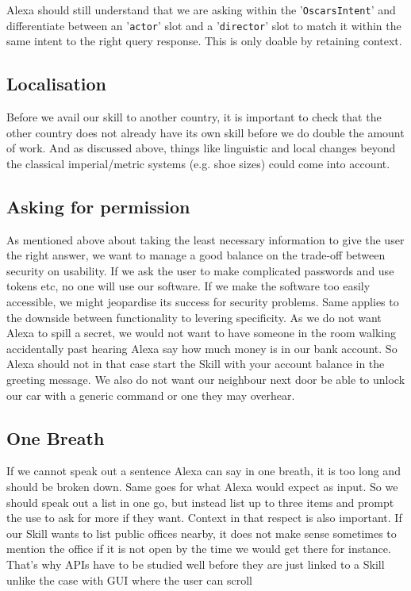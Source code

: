 

\noindent Alexa should still understand that we are asking within the '\texttt{OscarsIntent}' and differentiate between an '\texttt{actor}' slot and a '\texttt{director}' slot to match it within the same intent to the right query response.
This is only doable by retaining context.


\subsection*{Localisation}
Before we avail our skill to another country, it is important to check that the other country does not already have its own skill before we do double the amount of work. And as discussed above, things like linguistic and local changes beyond the classical imperial/metric systems (e.g. shoe sizes) could come into account.

\subsection*{Asking for permission}
As mentioned above about taking the least necessary information to give the user the right answer, we want to manage a good balance on the trade-off between security on usability. If we ask the user to make complicated passwords and use tokens etc, no one will use our software. If we make the software too easily accessible, we might jeopardise its success for security problems. Same applies to the downside between functionality to levering specificity. As we do not want Alexa to spill a secret, we would not want to have someone in the room walking accidentally past hearing Alexa say how much money is in our bank account. So Alexa should not in that case start the Skill with your account balance in the greeting message. We also do not want our neighbour next door be able to unlock our car with a generic command or one they may overhear.

\subsection*{One Breath}
If we cannot speak out a sentence Alexa can say in one breath, it is too long and should be broken down. Same goes for what Alexa would expect as input. %
So we should speak out a list in one go, but instead list up to three items and prompt the use to ask for more if they want. Context in that respect is also important. If our Skill wants to list public offices nearby, it does not make sense sometimes to mention the office if it is not open by the time we would get there for instance. That's why APIs have to be studied well before they are just linked to a Skill unlike the case with GUI where the user can scroll

